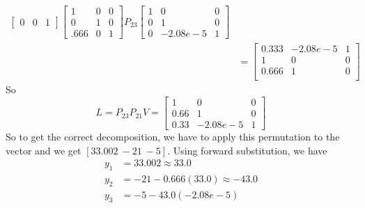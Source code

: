 \documentclass{homework}
\begin{document}
\begin{solution}
\[\begin{aligned}
\begin{bmatrix}
      0 & 0 & 1
    \end{bmatrix}
    \begin{bmatrix}
      1 & 0 & 0 \\
      0 & 1 & 0 \\
      .666 & 0 & 1
    \end{bmatrix}
    P_{23}
    \begin{bmatrix}
      1 & 0 & 0 \\
      0 & 1 & 0 \\
      0 & -2.08e-5 & 1
    \end{bmatrix} \\
    &=
    \begin{bmatrix}
      0.333 & -2.08e-5 & 1 \\
      1 & 0 & 0 \\
      0.666 & 1 & 0 \\
    \end{bmatrix}
  \end{aligned}
  \]
  So
  \[
    L = 
    P_{23}P_{21}V = 
    \begin{bmatrix}
      1 & 0 & 0 \\
      0.66 & 1 & 0 \\
      0.33 & -2.08e-5 & 1 
    \end{bmatrix}
  \]
  So to get the correct decomposition, we have to apply this permutation to the vector and we get $[33.002\ -21\ -5]$.
  Using forward substitution, we have
  \[
    \begin{aligned}
      y_1 &= 33.002 \approx 33.0 \\
      y_2 &= -21 - 0.666(33.0) \approx -43.0 \\
      y_3 &= -5 -43.0(-2.08e-5)
    \end{aligned}
  \]
\end{solution}
\end{document}
